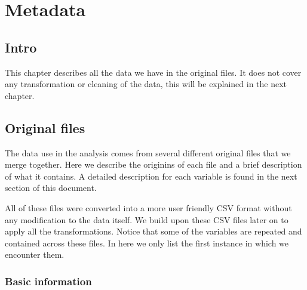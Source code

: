 \chapter{Metadata}\label{ch:metadata}


\section{Intro}

This chapter describes all the data we have in the original files. It does not cover any transformation or cleaning of the data, this will be explained in the next chapter. \vspace{3 mm}

\section{Original files}

The data use in the analysis comes from several different original files that we merge together. Here we describe the originins of each file and a brief description of what it contains. A detailed description for each variable is found in the next section of this document.\vspace{3 mm}

All of these files were converted into a more user friendly CSV format without any modification to the data itself. We build upon these CSV files later on to apply all the transformations. Notice that some of the variables are repeated and contained across these files. In here we only list the first instance in which we encounter them.\vspace{3 mm}

\subsection{Basic information}

